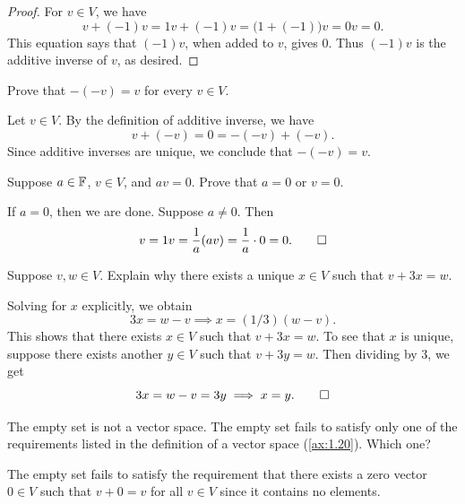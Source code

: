 \begin{proof}
For $v\in V$, we have
\[ v+(-1)v = 1v+(-1)v = \bigl(1+(-1)\bigr)v = 0v = 0. \]
This equation says that $(-1)v$, when added to $v$, gives $0$. Thus $(-1)v$ is
the additive inverse of $v$, as desired.
\end{proof}

\begin{exc}

\begin{exercise}
Prove that $-(-v)=v$ for every $v\in V$.
\end{exercise}
\begin{solution}
Let $v\in V$. By the definition of additive inverse, we have
\[ v+(-v) = 0 = -(-v)+(-v). \]
Since additive inverses are unique, we conclude that $-(-v)=v$.
\end{solution}

\begin{exercise}
Suppose $a\in\mathbb{F}$, $v\in V$, and $av=0$. Prove that $a=0$ or $v=0$.
\end{exercise}
\begin{solution}
If $a=0$, then we are done. Suppose $a\ne0$. Then
\[ v = 1v = \frac1a(av) = \frac1a\cdot0 = 0. \qedhere \]
\end{solution}

\begin{exercise}
Suppose $v,w\in V$. Explain why there exists a unique $x\in V$ such that
$v+3x=w$.
\end{exercise}
\begin{solution}
Solving for $x$ explicitly, we obtain
\[ 3x = w-v \implies x = (1/3)(w-v). \]
This shows that there exists $x\in V$ such that $v+3x=w$. To see that $x$ is
unique, suppose there exists another $y\in V$ such that $v+3y=w$. Then dividing
by $3$, we get
\[ 3x = w-v = 3y \implies x = y. \qedhere \]
\end{solution}

\begin{exercise}
The empty set is not a vector space. The empty set fails to satisfy only one of
the requirements listed in the definition of a vector space (\ref{ax:1.20}).
Which one?
\end{exercise}
\begin{solution}
The empty set fails to satisfy the requirement that there exists a zero vector
$0\in V$ such that $v+0=v$ for all $v\in V$ since it contains no elements.
\end{solution}


\end{exc}
